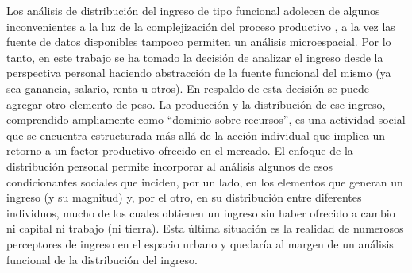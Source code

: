 	
Los análisis de distribución del ingreso de tipo funcional adolecen de algunos inconvenientes a la luz de la complejización del proceso productivo \cite{altimir1986}, a la vez las fuente de datos disponibles tampoco permiten un análisis microespacial. Por lo tanto, en este trabajo se ha tomado la decisión de analizar el ingreso desde la perspectiva personal haciendo abstracción de la fuente funcional del mismo (ya sea ganancia, salario, renta u otros). En respaldo de esta decisión se puede agregar otro elemento de peso. La producción y la distribución de ese ingreso, comprendido ampliamente como “dominio sobre recursos”, es una actividad social que se encuentra estructurada más allá de la acción individual que implica un retorno a un factor productivo ofrecido en el mercado. El enfoque de la distribución personal permite incorporar al análisis algunos de esos condicionantes sociales que inciden, por un lado, en los elementos que generan un ingreso (y su magnitud) y, por el otro, en su distribución entre diferentes individuos, mucho de los cuales obtienen un ingreso sin haber ofrecido a cambio ni capital ni trabajo (ni tierra). Esta última situación es la realidad de numerosos perceptores de ingreso en el espacio urbano y quedaría al margen de un análisis funcional de la distribución del ingreso.
	

